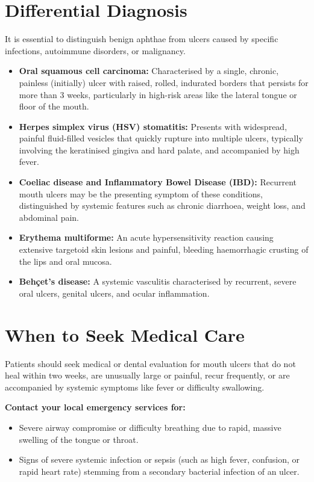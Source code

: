 \section*{Differential Diagnosis}
It is essential to distinguish benign aphthae from ulcers caused by specific infections, autoimmune disorders, or malignancy.
\begin{itemize}
    \item \textbf{Oral squamous cell carcinoma:} Characterised by a single, chronic, painless (initially) ulcer with raised, rolled, indurated borders that persists for more than 3 weeks, particularly in high-risk areas like the lateral tongue or floor of the mouth.
    \item \textbf{Herpes simplex virus (HSV) stomatitis:} Presents with widespread, painful fluid-filled vesicles that quickly rupture into multiple ulcers, typically involving the keratinised gingiva and hard palate, and accompanied by high fever.
    \item \textbf{Coeliac disease and Inflammatory Bowel Disease (IBD):} Recurrent mouth ulcers may be the presenting symptom of these conditions, distinguished by systemic features such as chronic diarrhoea, weight loss, and abdominal pain.
    \item \textbf{Erythema multiforme:} An acute hypersensitivity reaction causing extensive targetoid skin lesions and painful, bleeding haemorrhagic crusting of the lips and oral mucosa.
    \item \textbf{Behçet's disease:} A systemic vasculitis characterised by recurrent, severe oral ulcers, genital ulcers, and ocular inflammation.
\end{itemize}

\section*{When to Seek Medical Care}
Patients should seek medical or dental evaluation for mouth ulcers that do not heal within two weeks, are unusually large or painful, recur frequently, or are accompanied by systemic symptoms like fever or difficulty swallowing.

\textbf{Contact your local emergency services for:}
\begin{itemize}
    \item Severe airway compromise or difficulty breathing due to rapid, massive swelling of the tongue or throat.
    \item Signs of severe systemic infection or sepsis (such as high fever, confusion, or rapid heart rate) stemming from a secondary bacterial infection of an ulcer.
\end{itemize}

